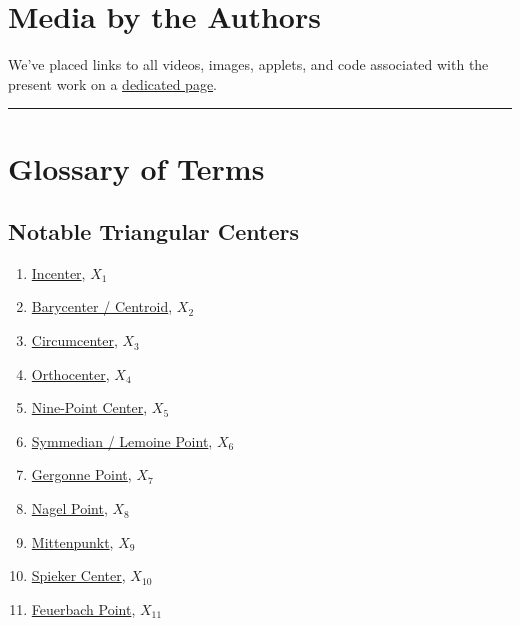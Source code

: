 \documentclass[]{article}
\providecommand{\tightlist}{%
  \setlength{\itemsep}{0pt}\setlength{\parskip}{0pt}}
\begin{document}
\hypertarget{media-by-the-authors}{%
\section{Media by the Authors}\label{media-by-the-authors}}

We've placed links to all videos, images, applets, and code associated with the present work on a \href{videos.html}{dedicated page}.

\begin{center}\rule{0.5\linewidth}{\linethickness}\end{center}

\hypertarget{glossary-of-terms}{%
\section{Glossary of Terms}\label{glossary-of-terms}}

\hypertarget{notable-triangular-centers}{%
\subsection{Notable Triangular Centers}\label{notable-triangular-centers}}

\begin{enumerate}
\def\labelenumi{\arabic{enumi}.}
\tightlist
\item
  \href{http://mathworld.wolfram.com/Incenter.html}{Incenter}, \(X_1\)
\item
  \href{http://mathworld.wolfram.com/TriangleCentroid.html}{Barycenter / Centroid}, \(X_2\)
\item
  \href{http://mathworld.wolfram.com/Circumcenter.html}{Circumcenter}, \(X_3\)
\item
  \href{http://mathworld.wolfram.com/Orthocenter.html}{Orthocenter}, \(X_4\)
\item
  \href{http://mathworld.wolfram.com/Nine-PointCenter.html}{Nine-Point Center}, \(X_5\)
\item
  \href{http://mathworld.wolfram.com/SymmedianPoint.html}{Symmedian / Lemoine Point}, \(X_6\)
\item
  \href{http://mathworld.wolfram.com/SymmedianPoint.html}{Gergonne Point}, \(X_7\)
\item
  \href{http://mathworld.wolfram.com/NagelPoint.html}{Nagel Point}, \(X_8\)
\item
  \href{http://mathworld.wolfram.com/Mittenpunkt.html}{Mittenpunkt}, \(X_9\)
\item
  \href{http://mathworld.wolfram.com/Mittenpunkt.html}{Spieker Center}, \(X_{10}\)
\item
  \href{http://mathworld.wolfram.com/FeuerbachPoint.html}{Feuerbach Point}, \(X_{11}\)
\end{enumerate}
\end{document}
